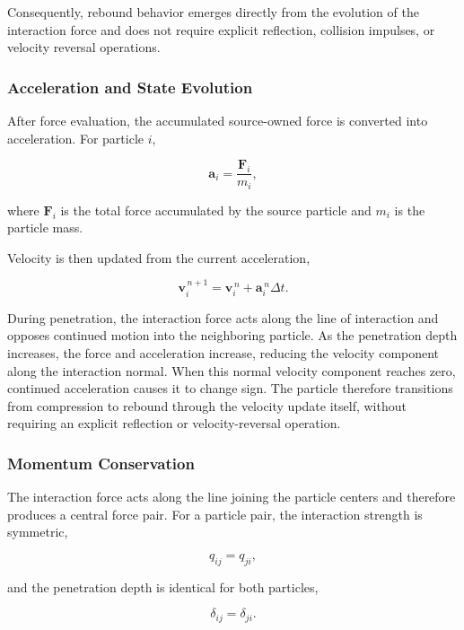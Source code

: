 Consequently, rebound behavior emerges directly from
the evolution of the interaction force and does not
require explicit reflection, collision impulses, or
velocity reversal operations.

\subsubsection{Acceleration and State Evolution}

After force evaluation, the accumulated source-owned
force is converted into acceleration. For particle $i$,

\begin{equation}
\mathbf{a}_i
=
\frac{\mathbf{F}_i}{m_i},
\end{equation}

where $\mathbf{F}_i$ is the total force accumulated
by the source particle and $m_i$ is the particle mass.

Velocity is then updated from the current acceleration,

\begin{equation}
\mathbf{v}_i^{\,n+1}=\mathbf{v}_i^{\,n}+\mathbf{a}_i^{\,n}\Delta t .
\end{equation}

During penetration, the interaction force acts along
the line of interaction and opposes continued motion
into the neighboring particle. As the penetration
depth increases, the force and acceleration increase,
reducing the velocity component along the interaction
normal. When this normal velocity component reaches
zero, continued acceleration causes it to change sign.
The particle therefore transitions from compression to
rebound through the velocity update itself, without
requiring an explicit reflection or velocity-reversal
operation.

\subsubsection{Momentum Conservation}

The interaction force acts along the line joining the
particle centers and therefore produces a central
force pair. For a particle pair, the interaction
strength is symmetric,

\begin{equation}
q_{ij}=q_{ji},
\end{equation}

and the penetration depth is identical for both
particles,

\begin{equation}
\delta_{ij}=\delta_{ji}.
\end{equation}

